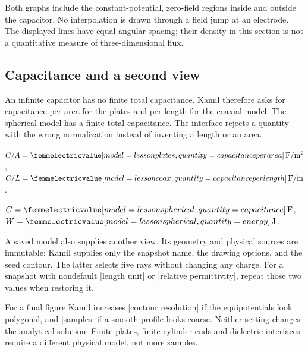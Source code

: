 Both graphs include the constant-potential, zero-field regions inside and
outside the capacitor. No interpolation is drawn through a field jump at an
electrode. The displayed lines have equal angular spacing; their density in
this section is not a quantitative measure of three-dimensional flux.

\subsection{Capacitance and a second view}
An infinite capacitor has no finite total capacitance. Kamil therefore asks
for capacitance per area for the plates and per length for the coaxial model.
The spherical model has a finite total capacitance. The interface rejects a
quantity with the wrong normalization instead of inventing a length or an area.

\begin{codeexample}[width=0pt]
$C/A=\femmelectricvalue[model=lesson plates,
  quantity=capacitance per area]\,\mathrm{F/m^2}$,\quad
$C/L=\femmelectricvalue[model=lesson coax,
  quantity=capacitance per length]\,\mathrm{F/m}$.
\par
$C=\femmelectricvalue[model=lesson spherical,
  quantity=capacitance]\,\mathrm F$,\quad
$W=\femmelectricvalue[model=lesson spherical,quantity=energy]\,\mathrm J$.
\end{codeexample}

A saved model also supplies another view. Its geometry and physical sources
are immutable: Kamil supplies only the snapshot name, the drawing options,
and the seed contour. The latter selects five rays without changing any charge.
For a snapshot with nondefault |length unit| or |relative permittivity|, repeat
those two values when restoring it.

\begin{codeexample}[width=0pt]
\end{codeexample}

For a final figure Kamil increases |contour resolution| if the equipotentials
look polygonal, and |samples| if a smooth profile looks coarse. Neither setting
changes the analytical solution. Finite plates, finite cylinder ends and
dielectric interfaces require a different physical model, not more samples.
